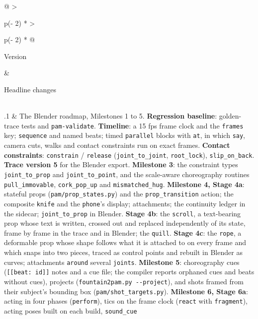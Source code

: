 \documentclass[
  12pt,
  letterpaper,
]{book}
\begin{document}
\begin{longtable}[]{@{}
  >{\raggedright\arraybackslash}p{(\columnwidth - 2\tabcolsep) * }
  >{\raggedright\arraybackslash}p{(\columnwidth - 2\tabcolsep) * }@{}}
\toprule\noalign{}
\begin{minipage}[b]{\linewidth}\raggedright
Version
\end{minipage} & \begin{minipage}[b]{\linewidth}\raggedright
Headline changes
\end{minipage} \\
\midrule\noalign{}
\endhead
\bottomrule\noalign{}
.1 & The Blender roadmap, Milestones 1 to 5. \textbf{Regression
baseline}: golden-trace tests and \texttt{pam-validate}.
\textbf{Timeline}: a 15 fps frame clock and the \texttt{frames} key;
\texttt{sequence} and named beats; timed \texttt{parallel} blocks with
\texttt{at}, in which \texttt{say}, camera cuts, walks and contact
constraints run on exact frames. \textbf{Contact constraints}:
\texttt{constrain} / \texttt{release} (\texttt{joint\_to\_joint},
\texttt{root\_lock}), \texttt{slip\_on\_back}. \textbf{Trace
version 5} for the Blender export. \textbf{Milestone 3}: the
constraint types \texttt{joint\_to\_prop} and \texttt{joint\_to\_point},
and the scale-aware choreography routines \texttt{pull\_immovable},
\texttt{cork\_pop\_up} and \texttt{mismatched\_hug}. \textbf{Milestone 4,
Stage 4a}: stateful props (\texttt{pam/prop\_states.py}) and the
\texttt{prop\_transition} action; the composite \texttt{knife} and the
\texttt{phone}'s display; attachments; the continuity ledger in the
sidecar; \texttt{joint\_to\_prop} in Blender. \textbf{Stage 4b}: the
\texttt{scroll}, a text-bearing prop whose text is written, crossed
out and replaced independently of its state, frame by frame in the
trace and in Blender; the \texttt{quill}. \textbf{Stage 4c}: the
\texttt{rope}, a deformable prop whose shape follows what it is
attached to on every frame and which snaps into two pieces, traced as
control points and rebuilt in Blender as curves; attachments
\texttt{around} several \texttt{joints}. \textbf{Milestone 5}:
choreography cues (\texttt{[[beat: id]]} notes and a cue file; the
compiler reports orphaned cues and beats without cues), projects
(\texttt{fountain2pam.py -{}-project}), and shots framed from their
subject's bounding box (\texttt{pam/shot\_targets.py}).
\textbf{Milestone 6, Stage 6a}: acting in four phases
(\texttt{perform}), tics on the frame clock (\texttt{react} with
\texttt{fragment}), acting poses built on each build, \texttt{sound\_cue}

\end{longtable}
\end{document}
